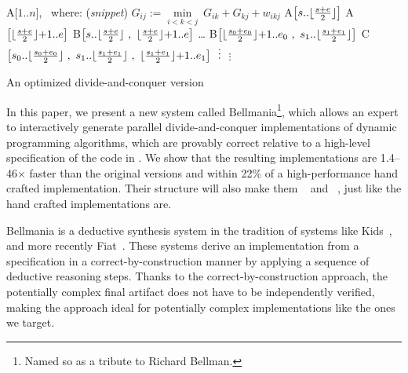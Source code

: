 \begin{algorithm}[b!]
\fontsize{9}{10}   %
\begin{algorithmic}
  \State A[$1..n$], ~where: \hfill{\normalsize (\textit{snippet})}
	      \State $G_{ij} := \underset{i<k<j}\min ~ G_{ik} + G_{kj} + w_{ikj}$
	    \EndFor
	  \EndFor
    \vspace{-5pt}
	\Else
	  \State A$\big[ s..\lfloor\frac{s+e}{2}\rfloor \big]$
	  \State A$\big[ \lfloor\frac{s+e}{2}\rfloor{+}1..e \big]$
	  \State B$\big[ s..\lfloor\frac{s+e}{2}\rfloor ~,~ \lfloor\frac{s+e}{2}\rfloor{+}1..e \big]$
	\EndIf
  \EndProcedure
	 \ldots
	\Else
	  \State B$\big[ \lfloor\frac{s_0+e_0}{2}\rfloor{+}1..e_0 ~,~ s_1..\lfloor\frac{s_1+e_1}{2}\rfloor \big]$
	  \State C$\big[ s_0..\lfloor\frac{s_0+e_0}{2}\rfloor ~,~ s_1..\lfloor\frac{s_1+e_1}{2}\rfloor ~,~ \lfloor\frac{s_1+e_1}{2}\rfloor{+}1..e_1 \big]$
	  \vspace{-5pt}
	  \State $\vdotswithin{C}$
	\EndIf
  \EndProcedure
    \vspace{-5pt}
    \State $\vdots$
  \EndProcedure
\end{algorithmic}
\caption{\label{intro:divide-and-conquer}
   An optimized divide-and-conquer version}
\end{algorithm}




In this paper, we present a new system called Bellmania\footnote{Named so as a tribute to Richard Bellman.}, which allows an expert to interactively generate parallel divide-and-conquer implementations of dynamic programming algorithms, which are provably correct relative to a high-level specification of the code in . We show that the resulting implementations are \cbstart{}1.4--46$\times$\cbend{} faster than the original versions and within 22\% of a high-performance hand crafted implementation.
Their structure will also make them ~\cite{FOCS99/Frigo} and ~\cite{SODA14/Bender}, just like the hand crafted implementations are.


Bellmania is a deductive synthesis system in the tradition of systems like Kids~\cite{TSE90/Smith}, and more recently Fiat~\cite{POPL15/Delaware}. 
These systems derive an implementation from a specification in a correct-by-construction manner by applying a sequence of deductive reasoning steps. Thanks to the correct-by-construction approach, the potentially complex final artifact does not have to be independently verified, making the approach ideal for potentially complex implementations like the ones we target. 

